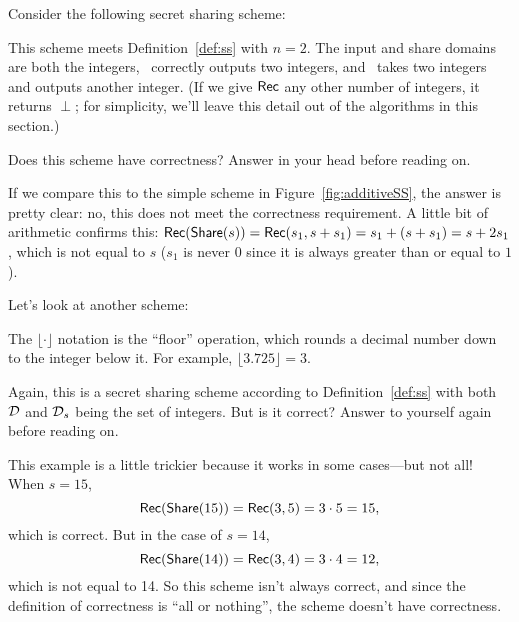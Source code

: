 \begin{example}
    Consider the following secret sharing scheme:
    \begin{pchstack}[center]
    \pchspace
    \end{pchstack}
    This scheme meets Definition~\ref{def:ss} with $n=2$. The input and share domains
    are both the integers, \share~correctly outputs two integers, and 
    \rec~takes two integers and outputs another integer. (If we give $\mathsf{Rec}$
    any other number of integers, it returns $\perp$; for simplicity, we'll 
    leave this detail out of the algorithms in this section.)

    Does this scheme have correctness? Answer in your head before reading on.

    If we compare this to the simple scheme in Figure~\ref{fig:additiveSS},
    the answer is pretty clear: no, this does not meet the correctness 
    requirement. A little bit of arithmetic confirms this: $\mathsf{Rec}(\mathsf{Share}(s))
    = \mathsf{Rec}(s_1, s+s_1) = s_1 + (s+s_1) = s + 2s_1$, which is not equal to $s$
    ($s_1$ is never 0 since it is always greater than or equal to $1$). 
\end{example}

\begin{example}\label{ex:floor3}
    Let's look at another scheme:
    \begin{pchstack}[center]
    \pchspace
    \end{pchstack}
    The $\lfloor \cdot \rfloor$ notation is the ``floor'' operation, which 
    rounds a decimal number down to the integer below it. For example, $\lfloor 3.725 
    \rfloor = 3$.

    Again, this is a secret sharing scheme according to Definition~\ref{def:ss}
    with both $\mathcal{D}$ and $\mathcal{D}_s$ being the set of integers.
    But is it correct? Answer to yourself again before reading on.

    This example is a little trickier because it works in some cases---but not all! 
    When $s=15$, 
    \[
        \mathsf{Rec}(\mathsf{Share}(15)) = \mathsf{Rec}(3,5) = 3\cdot 5 = 15,
    \]
    which is correct.
    But in the case of $s=14$, 
    \[
        \mathsf{Rec}(\mathsf{Share}(14)) = \mathsf{Rec}(3, 4) = 3 \cdot 4 = 12,
    \]
    which is not equal to 14.
    So this scheme isn't always correct, and since the definition of correctness 
    is ``all or nothing''\footnotemark, the scheme doesn't have correctness.
\end{example}

